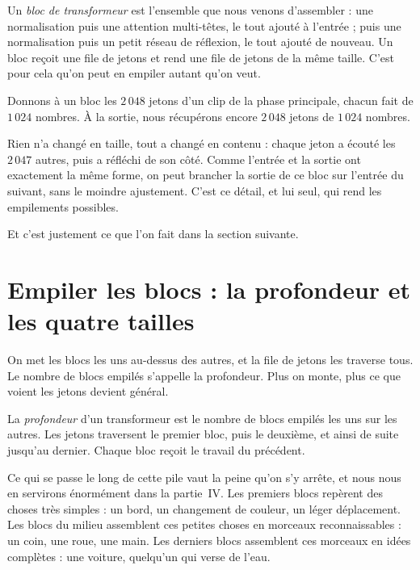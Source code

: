 \begin{definition}
Un \emph{bloc de transformeur} est l'ensemble que nous venons d'assembler :
une normalisation puis une attention multi-têtes, le tout ajouté à l'entrée ;
puis une normalisation puis un petit réseau de réflexion, le tout ajouté de
nouveau. Un bloc reçoit une file de jetons et rend une file de jetons de la
même taille. C'est pour cela qu'on peut en empiler autant qu'on veut.
\end{definition}

\begin{exemple}
Donnons à un bloc les $2\,048$ jetons d'un clip de la phase principale,
chacun fait de $1\,024$ nombres. À la sortie, nous récupérons encore
$2\,048$ jetons de $1\,024$ nombres.

Rien n'a changé en taille, tout a changé en contenu : chaque jeton a écouté
les $2\,047$ autres, puis a réfléchi de son côté. Comme l'entrée et la
sortie ont exactement la même forme, on peut brancher la sortie de ce bloc
sur l'entrée du suivant, sans le moindre ajustement. C'est ce détail, et lui
seul, qui rend les empilements possibles.
\end{exemple}

Et c'est justement ce que l'on fait dans la section suivante.

\section{Empiler les blocs : la profondeur et les quatre tailles}

\begin{enclair}
On met les blocs les uns au-dessus des autres, et la file de jetons les
traverse tous. Le nombre de blocs empilés s'appelle la profondeur. Plus on
monte, plus ce que voient les jetons devient général.
\end{enclair}

\begin{definition}[La profondeur][profondeur]
La \emph{profondeur} d'un transformeur est le nombre de blocs empilés les uns
sur les autres. Les jetons traversent le premier bloc, puis le deuxième, et
ainsi de suite jusqu'au dernier. Chaque bloc reçoit le travail du précédent.
\end{definition}

Ce qui se passe le long de cette pile vaut la peine qu'on s'y arrête, et
nous nous en servirons énormément dans la partie~IV. Les premiers blocs
repèrent des choses très simples : un bord, un changement de couleur, un
léger déplacement. Les blocs du milieu assemblent ces petites choses en
morceaux reconnaissables : un coin, une roue, une main. Les derniers blocs
assemblent ces morceaux en idées complètes : une voiture, quelqu'un qui
verse de l'eau.

